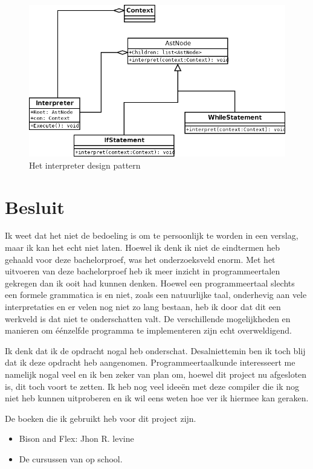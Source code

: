 \documentclass[11pt,a4paper]{article}
\begin{document}
\begin{figure}[ht]
\centering
\includegraphics[width=\textwidth]{afbeeldingen/interpreter_small}
\caption{Het interpreter design pattern}
\end{figure}

\section{Besluit}
Ik weet dat het niet de bedoeling is om te persoonlijk te worden in een verslag, maar ik kan het echt niet laten. Hoewel ik denk ik niet de eindtermen heb gehaald voor deze bachelorproef, was het onderzoeksveld enorm. Met het uitvoeren van deze bachelorproef heb ik meer inzicht in programmeertalen gekregen dan ik ooit had kunnen denken. Hoewel een programmeertaal slechts een formele grammatica is en niet, zoals een natuurlijke taal, onderhevig aan vele interpretaties en er velen nog niet zo lang bestaan, heb ik door dat dit een werkveld is dat niet te onderschatten valt. De verschillende mogelijkheden en manieren om éénzelfde programma te implementeren zijn echt overweldigend.

Ik denk dat ik de opdracht nogal heb onderschat. Desalniettemin ben ik toch blij dat ik deze opdracht heb aangenomen. Programmeertaalkunde interesseert me namelijk nogal veel en ik ben zeker van plan om, hoewel dit project nu afgesloten is, dit toch voort te zetten. Ik heb nog veel ideeën met deze compiler die ik nog niet heb kunnen uitproberen en ik wil eens weten hoe ver ik hiermee kan geraken.

De boeken die ik gebruikt heb voor dit project zijn.
\begin{itemize}
\item Bison and Flex: Jhon R. levine
\item De cursussen van op school.
\end{itemize}
\end{document}
